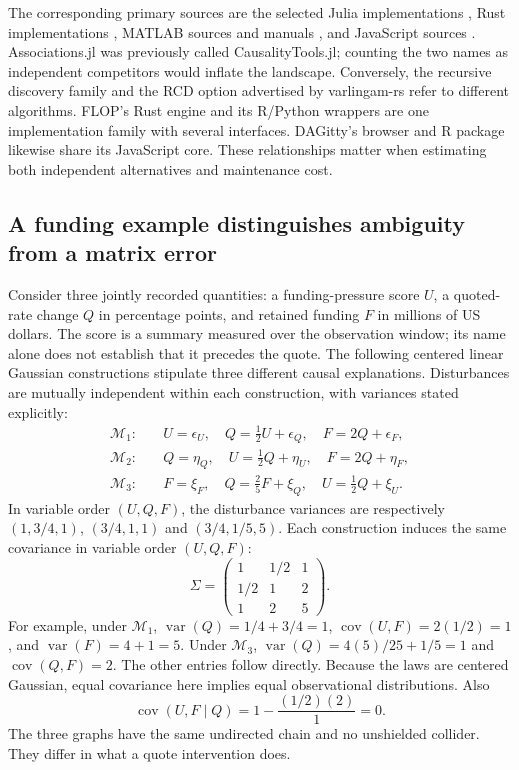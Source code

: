 The corresponding primary sources are the selected Julia implementations
\citep{exec13_other_causalinference,exec13_other_associations,exec13_other_recursive},
Rust implementations
\citep{exec13_other_flopsearch,exec13_other_varlingam,exec13_other_why},
MATLAB sources and manuals
\citep{exec13_other_explorer,exec13_other_generalized,exec13_other_bnt},
and JavaScript sources
\citep{exec13_other_webapp,exec13_other_dagitty}.
Associations.jl was previously called CausalityTools.jl; counting the two names
as independent competitors would inflate the landscape. Conversely, the
recursive discovery family and the RCD option advertised by varlingam-rs
refer to different algorithms. FLOP's Rust engine and its R/Python wrappers
are one implementation family with several interfaces. DAGitty's browser
and R package likewise share its JavaScript core. These relationships matter
when estimating both independent alternatives and maintenance cost.

\subsection{A funding example distinguishes ambiguity from a matrix error}

Consider three jointly recorded quantities: a funding-pressure score $U$, a
quoted-rate change $Q$ in percentage points, and retained funding $F$ in
millions of US dollars. The score is a summary measured over the observation
window; its name alone does not establish that it precedes the quote. The
following centered linear Gaussian constructions stipulate three different
causal explanations. Disturbances are mutually independent within each
construction, with variances stated explicitly:
\begin{align}
\mathcal M_1:\quad &U=\epsilon_U,\quad
 Q=\tfrac12U+\epsilon_Q,\quad F=2Q+\epsilon_F,\\
\mathcal M_2:\quad &Q=\eta_Q,\quad
 U=\tfrac12Q+\eta_U,\quad F=2Q+\eta_F,\\
\mathcal M_3:\quad &F=\xi_F,\quad
 Q=\tfrac25F+\xi_Q,\quad U=\tfrac12Q+\xi_U.
\end{align}
In variable order $(U,Q,F)$, the disturbance variances are respectively
$(1,3/4,1)$, $(3/4,1,1)$ and $(3/4,1/5,5)$.
Each construction induces
the same covariance in variable order $(U,Q,F)$:
\[
 \Sigma=\begin{pmatrix}
 1&1/2&1\\1/2&1&2\\1&2&5
 \end{pmatrix}.
\]
For example, under $\mathcal M_1$, $\operatorname{var}(Q)=1/4+3/4=1$,
$\operatorname{cov}(U,F)=2(1/2)=1$, and
$\operatorname{var}(F)=4+1=5$. Under $\mathcal M_3$,
$\operatorname{var}(Q)=4(5)/25+1/5=1$ and
$\operatorname{cov}(Q,F)=2$. The other entries follow directly.
Because the laws are centered Gaussian, equal covariance here implies equal
observational distributions. Also
\[
 \operatorname{cov}(U,F\mid Q)
 =1-\frac{(1/2)(2)}{1}=0.
\]
The three graphs have the same undirected chain and no unshielded collider.
They differ in what a quote intervention does.

